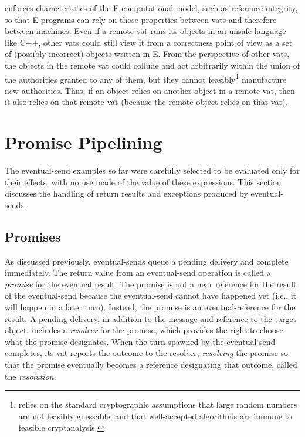 \documentclass{llncs}
\begin{document}
 enforces characteristics of the E computational model,
such as reference integrity, so that E programs can rely on those
properties between vats and therefore between machines. Even if a
remote vat runs its objects in an unsafe language like C++, other vats
could still view it from a correctness point of view as a set of
(possibly incorrect) objects written in E. From the perspective of
other vats, the objects in the remote vat could collude and act
arbitrarily within the union of the authorities granted to any of
them, but they cannot feasibly\footnote{
%
 relies on the standard cryptographic assumptions that
large random numbers are not feasibly guessable, and that
well-accepted algorithms are immune to feasible cryptanalysis.}
%
manufacture new authorities. Thus, if an object relies on another object in
a remote vat, then it also relies on that remote vat (because the
remote object relies on that vat).

\section{Promise Pipelining}

The eventual-send examples so far were carefully selected to be
evaluated only for their effects, with no use made of the value of
these expressions. This section discusses the handling of return
results and exceptions produced by eventual-sends.

\subsection{Promises}

As discussed previously, eventual-sends queue a pending delivery and
complete immediately.  The return value from an eventual-send
operation is called a \emph{promise} for the eventual result. The
promise is not a near reference for the result of the eventual-send
because the eventual-send cannot have happened yet (i.e., it will
happen in a later turn). Instead, the promise is an eventual-reference
for the result.  A pending delivery, in addition to the message and
reference to the target object, includes a \emph{resolver} for the
promise, which provides the right to choose what the promise
designates. When the turn spawned by the eventual-send completes, its
vat reports the outcome to the resolver, \emph{resolving} the promise
so that the promise eventually becomes a reference designating that
outcome, called the \emph{resolution}.  
\end{document}

